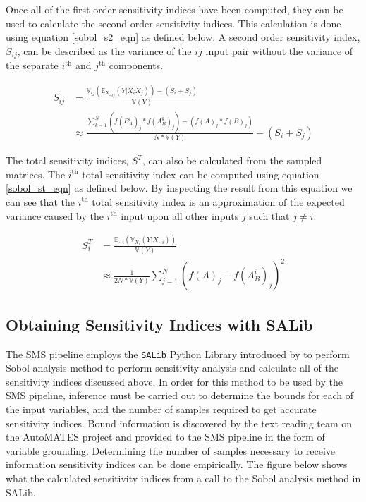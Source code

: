Once all of the first order sensitivity indices have been computed, they can be used to calculate the second order sensitivity indices. This calculation is done using equation \ref{sobol_s2_eqn} as defined below. A second order sensitivity index, $S_{ij}$, can be described as the variance of the $ij$ input pair without the variance of the separate $i^{\text{th}}$ and $j^{\text{th}}$ components.

\begin{equation} \label{sobol_s2_eqn}
  \begin{split}
    S_{ij} & = \frac{\mathbb{V}_{ij}\left(\mathbb{E}_{X_{\sim ij}}(Y | X_i X_j)\right)  - (S_i + S_j)}{\mathbb{V}(Y)} \\
     & \approx \frac{\sum_{k=1}^{N} \left(f(B_{A}^{i})_j * f(A_{B}^{k})_j\right) - \left(f(A)_j * f(B)_j\right)}{N * \mathbb{V}(Y)} - (S_i + S_j)
  \end{split}
\end{equation}

The total sensitivity indices, $S^T$, can also be calculated from the sampled matrices. The $i^{\text{th}}$ total sensitivity index can be computed using equation \ref{sobol_st_eqn} as defined below. By inspecting the result from this equation we can see that the $i^{\text{th}}$ total sensitivity index is an approximation of the expected variance caused by the $i^{\text{th}}$ input upon all other inputs $j$ such that $j\neq i$.

\begin{equation} \label{sobol_st_eqn}
  \begin{split}
    S_i^T & = \frac{\mathbb{E}_{\sim i}\left(\mathbb{V}_{X_i}(Y | X_{\sim i})\right)}{\mathbb{V}(Y)} \\
    & \approx \frac{1}{2N * \mathbb{V}(Y)} \sum_{j=1}^{N} \left(f(A)_j - f(A_{B}^{i})_j\right)^2
  \end{split}
\end{equation}

\subsection{Obtaining Sensitivity Indices with SALib\label{sec:si_analysis}}
The SMS pipeline employs the \texttt{SALib} Python Library introduced by \citet{salib2017} to perform Sobol analysis method to perform sensitivity analysis and calculate all of the sensitivity indices discussed above.
In order for this method to be used by the SMS pipeline, inference must be carried out to determine the bounds for each of the input variables, and the number of samples required to get accurate sensitivity indices.
Bound information is discovered by the text reading team on the AutoMATES project and provided to the SMS pipeline in the form of variable grounding.
Determining the number of samples necessary to receive information sensitivity indices can be done empirically.
The figure below shows what the calculated sensitivity indices from a call to the Sobol analysis method in SALib.

